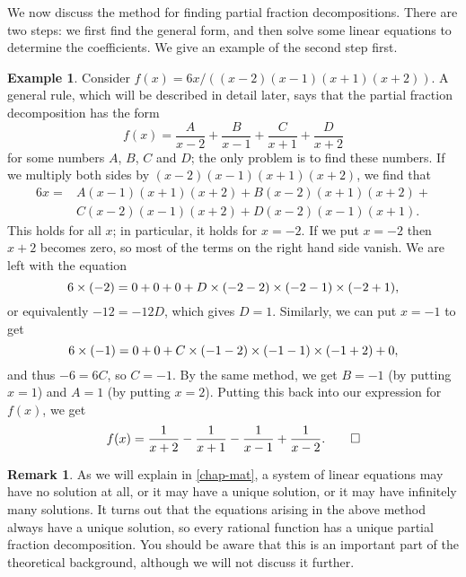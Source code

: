 \documentclass[a4paper]{book}
\theoremstyle{definition}
\newtheorem{remark}[theorem]{Remark}
\newtheorem{example}[theorem]{Example}
\begin{document}
We now discuss the method for finding partial fraction
decompositions.  There are two steps: we first find the general form,
and then solve some linear equations to determine the coefficients.
We give an example of the second step first.
\begin{example}
 Consider $f(x)=6x/((x-2)(x-1)(x+1)(x+2))$.  A general rule, which
 will be described in detail later, says that the partial fraction
 decomposition has the form
 \[ f(x) = \frac{A}{x-2} + \frac{B}{x-1} +
           \frac{C}{x+1} + \frac{D}{x+2}
 \]
 for some numbers $A$, $B$, $C$ and $D$; the only problem is to find
 these numbers.  If we multiply both sides by $(x-2)(x-1)(x+1)(x+2)$,
 we find that
 \begin{align*}
  6x =& A(x-1)(x+1)(x+2) + B(x-2)(x+1)(x+2) +\\
      & C(x-2)(x-1)(x+2) + D(x-2)(x-1)(x+1).
 \end{align*}
 This holds for all $x$; in particular, it holds for $x=-2$.  If we
 put $x=-2$ then $x+2$ becomes zero, so most of the terms on the right
 hand side vanish.  We are left with the equation
 \[ 6\times (-2) = 0+0+0+D\times(-2-2)\times(-2-1)\times(-2+1), \]
 or equivalently $-12=-12D$, which gives $D=1$.  Similarly, we can put
 $x=-1$ to get
 \[ 6\times(-1) = 0 + 0 + C\times(-1-2)\times(-1-1)\times(-1+2) + 0, \]
 and thus $-6=6C$, so $C=-1$.  By the same method, we get $B=-1$ (by
 putting $x=1$) and $A=1$ (by putting $x=2$).  Putting this back into
 our expression for $f(x)$, we get
 \[ f(x) =
     \frac{1}{x+2} - \frac{1}{x+1} - \frac{1}{x-1} + \frac{1}{x-2}.
     \qed
 \]
\end{example}
\begin{remark}
 As we will explain in \autoref{chap-mat}, a system of linear
 equations may have no solution at all, or it may have a unique
 solution, or it may have infinitely many solutions.  It turns out
 that the equations arising in the above method always have a unique
 solution, so every rational function has a unique partial fraction
 decomposition.  You should be aware that this is an important part of
 the theoretical background, although we will not discuss it further.
\end{remark}
\end{document}
